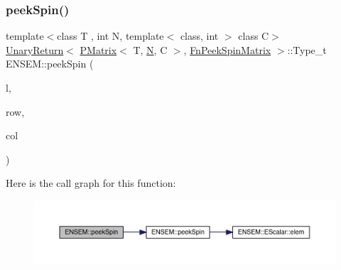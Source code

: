 \subsubsection{\texorpdfstring{peekSpin()}{peekSpin()}\hspace{0.1cm}{\footnotesize\ttfamily [2/2]}}
{\footnotesize\ttfamily template$<$class T , int N, template$<$ class, int $>$ class C$>$ \\
\mbox{\hyperlink{structENSEM_1_1UnaryReturn}{Unary\+Return}}$<$ \mbox{\hyperlink{classENSEM_1_1PMatrix}{P\+Matrix}}$<$ T, \mbox{\hyperlink{operator__name__util_8cc_a7722c8ecbb62d99aee7ce68b1752f337}{N}}, C $>$, \mbox{\hyperlink{structENSEM_1_1FnPeekSpinMatrix}{Fn\+Peek\+Spin\+Matrix}} $>$\+::Type\+\_\+t E\+N\+S\+E\+M\+::peek\+Spin (\begin{DoxyParamCaption}\item[{const \mbox{\hyperlink{classENSEM_1_1PMatrix}{P\+Matrix}}$<$ T, \mbox{\hyperlink{operator__name__util_8cc_a7722c8ecbb62d99aee7ce68b1752f337}{N}}, C $>$ \&}]{l,  }\item[{int}]{row,  }\item[{int}]{col }\end{DoxyParamCaption})\hspace{0.3cm}{\ttfamily [inline]}}

Here is the call graph for this function\+:\nopagebreak
\begin{figure}[H]
\begin{center}
\leavevmode
\includegraphics[width=350pt]{df/d0a/group__primmatrix_ga2efe19b2ef4dc4cbacc12117645bf8b8_cgraph}
\end{center}
\end{figure}
\mbox{\label{group__primmatrix_ga0cfeefefe2bd8b4e365ac10d8853664a}} 
